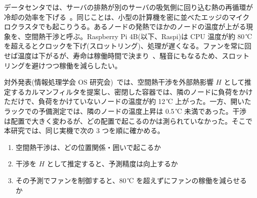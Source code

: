 \documentclass[10pt,uplatex,dvipdfmx,twocolumn]{jsarticle}
\makeatletter
\renewcommand{\section}{\@startsection{section}{1}{\z@}{0.6\Cvs \@plus.3\Cdp}{0.3\Cvs}{\normalfont\large\headfont\raggedright}}
\makeatother
\begin{document}
\newcommand{\TBD}[1]{\textcolor{red}{【#1】}}

\section{はじめに}
データセンタでは、サーバの排熱が別のサーバの吸気側に回り込む熱の再循環が冷却の効率を下げる~\cite{moore,tang}。同じことは、小型の計算機を密に並べたエッジのマイクロクラスタでも起こりうる。あるノードの発熱でほかのノードの温度が上がる現象を、空間熱干渉と呼ぶ。Raspberry Pi 4B(以下、Raspi)は CPU 温度が約 80\,℃ を超えるとクロックを下げ(スロットリング)、処理が遅くなる。ファンを常に回せば温度は下がるが、寿命は稼働時間で決まり~\cite{kim}、騒音にもなるため、スロットリングを避けつつ稼働を減らしたい。

対外発表(情報処理学会 OS 研究会)~\cite{ipsj}では、空間熱干渉を外部熱影響 $H$ として推定するカルマンフィルタを提案し、密閉した容器では、隣のノードに負荷をかけただけで、負荷をかけていないノードの温度が約 12\,℃ 上がった。一方、開いたラックでの予備測定では、隣のノードの温度上昇は 0.5\,℃ 未満であった。干渉は配置で大きく変わるが、どの配置で起こるのかは測られていなかった。そこで本研究では、同じ実機で次の 3 つを順に確かめる。
\begin{enumerate}
  \setlength{\itemsep}{0pt}
  \item[RQ1] 空間熱干渉は、どの位置関係・囲いで起こるか
  \item[RQ2] 干渉を $H$ として推定すると、予測精度は向上するか
  \item[RQ3] その予測でファンを制御すると、80\,℃ を超えずにファンの稼働を減らせるか
\end{enumerate}
\end{document}
